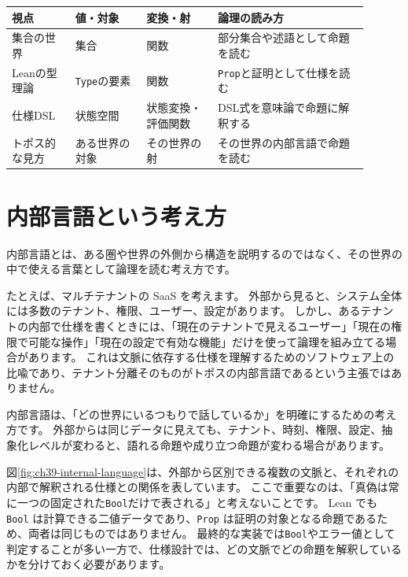 \begin{center}
\begin{tabular}{@{}p{0.16\linewidth}p{0.18\linewidth}p{0.18\linewidth}p{0.38\linewidth}@{}}
\toprule
視点 & 値・対象 & 変換・射 & 論理の読み方 \\
\midrule
集合の世界 & 集合 & 関数 & 部分集合や述語として命題を読む \\
Leanの型理論 & \texttt{Type}の要素 & 関数 & \texttt{Prop}と証明として仕様を読む \\
仕様DSL & 状態空間 & 状態変換・評価関数 & DSL式を意味論で命題に解釈する \\
トポス的な見方 & ある世界の対象 & その世界の射 & その世界の内部言語で命題を読む \\
\bottomrule
\end{tabular}
\end{center}

\section{内部言語という考え方}

内部言語とは、ある圏や世界の外側から構造を説明するのではなく、その世界の中で使える言葉として論理を読む考え方です。

たとえば、マルチテナントの SaaS を考えます。
外部から見ると、システム全体には多数のテナント、権限、ユーザー、設定があります。
しかし、あるテナントの内部で仕様を書くときには、「現在のテナントで見えるユーザー」「現在の権限で可能な操作」「現在の設定で有効な機能」だけを使って論理を組み立てる場合があります。
これは文脈に依存する仕様を理解するためのソフトウェア上の比喩であり、テナント分離そのものがトポスの内部言語であるという主張ではありません。

内部言語は、「どの世界にいるつもりで話しているか」を明確にするための考え方です。
外部からは同じデータに見えても、テナント、時刻、権限、設定、抽象化レベルが変わると、語れる命題や成り立つ命題が変わる場合があります。


図\ref{fig:ch39-internal-language}は、外部から区別できる複数の文脈と、それぞれの内部で解釈される仕様との関係を表しています。
ここで重要なのは、「真偽は常に一つの固定された\texttt{Bool}だけで表される」と考えないことです。
Lean でも \texttt{Bool} は計算できる二値データであり、\texttt{Prop} は証明の対象となる命題であるため、両者は同じものではありません。
最終的な実装では\texttt{Bool}やエラー値として判定することが多い一方で、仕様設計では、どの文脈でどの命題を解釈しているかを分けておく必要があります。

